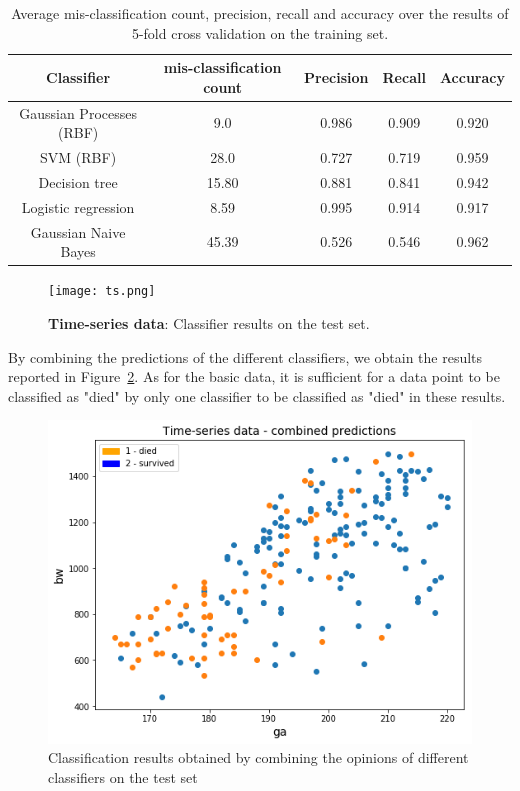\documentclass[a4paper,11pt]{article}
\begin{document}
\begin{table}[H]
    \centering
    \begin{tabular}{|c|c|c|c|c|}
    \hline
        Classifier & mis-classification count & Precision & Recall & Accuracy \\
    \hline
        Gaussian Processes (RBF)& 9.0   & 0.986 & 0.909 & 0.920\\
        SVM (RBF)               & 28.0  & 0.727 & 0.719 & 0.959\\
        Decision tree           & 15.80 & 0.881 & 0.841 & 0.942\\
        Logistic regression     & 8.59  & 0.995 & 0.914 & 0.917\\
        Gaussian Naive Bayes    & 45.39 & 0.526 & 0.546 & 0.962\\
    \hline
    \end{tabular}
    \caption{Average mis-classification count, precision, recall and accuracy over the results of 5-fold cross validation on the training set.}
    \label{tab:tsscores}
\end{table}

\begin{figure}[H]
    \centering
    \texttt{[image: ts.png]}
    \caption{\textbf{Time-series data}: Classifier results on the test set.}
    \label{fig:tstest}
\end{figure}

By combining the predictions of the different classifiers, we obtain the results reported in Figure~\ref{fig:tscomb}. As for the basic data, it is sufficient for a data point to be classified as "died" by only one classifier to be classified as "died" in these results.

\begin{figure}[H]
    \centering
    \includegraphics[width=0.7\linewidth]{ts_combined.png}
    \caption{Classification results obtained by combining the opinions of different classifiers on the test set}
    \label{fig:tscomb}
\end{figure}
\end{document}
